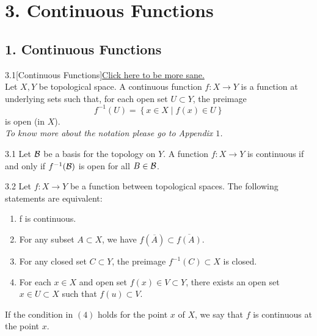 \section*{3. Continuous Functions}

\subsection*{1. Continuous Functions}

\begin{customdefinition}{3.1}[Continuous Functions]\hypertarget{d_3.1}{\hyperlink{d_1.1}{Click here to be more sane.}}\\
Let $X, Y$ be topological space. A continuous function $f: X \longrightarrow Y$ is a function at underlying sets such that, for each open set $U \subset Y$, the preimage 
$$f^{-1}(U) = \left\{x \in X \mid f(x) \in U\right\}$$
is open (in $X$).\\
\emph{To know more about the notation please go to Appendix $1$.}
\end{customdefinition}

\begin{customlemma}{3.1}
Let $\mathcal{B}$ be a basis for the topology on $Y$. A function $f: X \longrightarrow Y$ is continuous if and only if $f^{-1}(\mathcal{B})$ is open for all $B \in \mathcal{B}$.
\end{customlemma}

\begin{customthm}{3.2}
Let $f: X \longrightarrow Y$ be a function between topological spaces. The following statements are equivalent:
\begin{enumerate}
    \item[1).] f is continuous.
    \item[2).] For any subset $A \subset X$, we have $f(\overline{A}) \subset \overline{f(A)}$.
    \item[3).] For any closed set $C \subset Y$, the preimage $f^{-1}(C) \subset X$ is closed.
    \item[4).] For each $x \in X$ and open set $f(x) \in V \subset Y$, there exists an open set $x \in U \subset X$ such that $f(u) \subset V.$
\end{enumerate}
If the condition in $(4)$ holds for the point $x$ of $X$, we say that $f$ is continuous at the point $x$.
\end{customthm}

